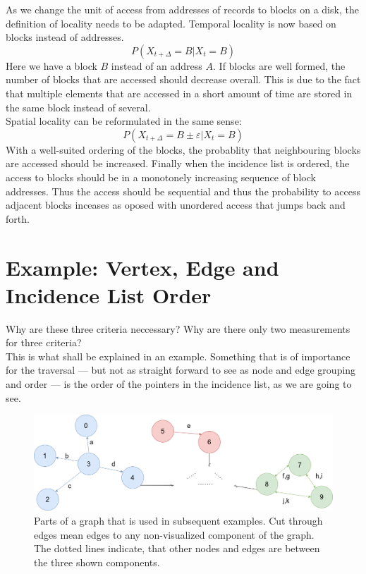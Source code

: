     As we change the unit of access from addresses of records to blocks on a disk, the definition of locality needs to be adapted.
    Temporal locality is now based on blocks instead of addresses.
     \[ P (X_{t + \Delta} = B | X_t = B) \]
     Here we have a block $B$ instead of an address $A$. 
     If blocks are well formed, the number of blocks that are accessed should decrease overall.
     This is due to the fact that multiple elements that are accessed in a short amount of time are stored in the same block instead of several. \\
     Spatial locality can be reformulated in the same sense:
      \[ P(X_{t + \Delta} = B \pm \varepsilon | X_t = B) \]
      With a well-suited ordering of the blocks, the probablity that neighbouring blocks are accessed should be increased.
      Finally when the incidence list is ordered, the access to blocks should be in a monotonely increasing sequence of block addresses. 
      Thus the access should be sequential and thus the probability to access adjacent blocks inceases as oposed with unordered access that jumps back and forth.
    
\section{Example: Vertex, Edge and Incidence List Order}
  Why are these three criteria neccessary? Why are there only two measurements for three criteria? \\
  This is what shall be explained in an example.
  Something that is of importance for the traversal --- but not as straight forward to see as node and edge grouping and order --- is the order of the pointers in the incidence list, as we are going to see.
  
  \begin{figure}[htp]
    \begin{center}
        \includegraphics[keepaspectratio,height=0.3\textheight,width=\textwidth]{img/05-problem_def/example_graph.png}
    \end{center}
    \caption{Parts of a graph that is used in subsequent examples. Cut through edges mean edges to any non-visualized component of the graph. The dotted lines indicate, that other nodes and edges are between the three shown components.}
    \label{ex-gr}
  \end{figure}
  

